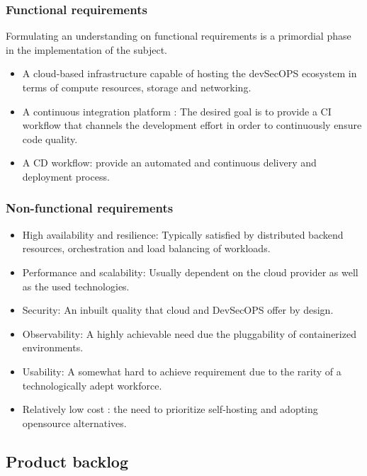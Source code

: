 \subsubsection{Functional requirements}

Formulating an understanding on functional requirements is a primordial phase in the implementation of the subject.

\begin{itemize}[label={--}]
\item A cloud-based infrastructure capable of hosting the devSecOPS ecosystem in terms of compute resources, storage and networking.
\item A continuous integration platform : The desired goal is to provide a CI workflow that channels the development effort in order to continuously ensure code quality.
\item A CD workflow: provide an automated and continuous delivery and deployment process.
\end{itemize}

\subsubsection{Non-functional requirements}

\begin{itemize}[label={--}]
\item High availability and resilience: Typically satisfied by distributed backend resources, orchestration and load balancing of workloads. 
\item Performance and scalability: Usually dependent on the cloud provider as well as the used technologies.
\item Security: An inbuilt quality that cloud and DevSecOPS offer by design.
\item Observability: A highly achievable need due the pluggability of containerized environments.
\item Usability: A somewhat hard to achieve requirement due to the rarity of a technologically adept workforce. 
\item Relatively low cost : the need to prioritize self-hosting and adopting opensource alternatives.
\end{itemize}

\newpage
\subsection{Product backlog }

